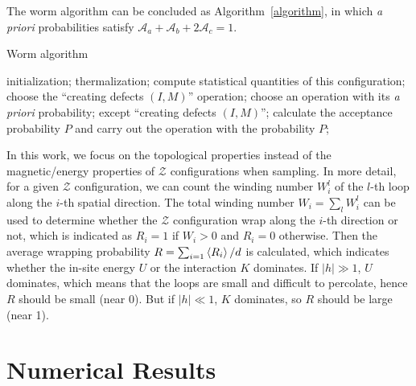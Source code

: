\documentclass{article}
\theoremstyle{plain} \newtheorem{thm}{Theorem}[section]
\theoremstyle{definition} \newtheorem{df}{Definition}[section]
\theoremstyle{definition} \newtheorem{eg}{Example}
\theoremstyle{remark} \newtheorem*{rmk}{Remark}
\begin{document}
The worm algorithm can be concluded as Algorithm~\ref{algorithm}, in which \textit{a priori} probabilities satisfy $\mathcal{A}_a+\mathcal{A}_b+2\mathcal{A}_c = 1$.\\
\begin{minipage}{\linewidth}
  \begin{algorithm}[H]
  \caption{Worm algorithm}
  \label{algorithm}
  \begin{algorithmic}
    \STATE initialization;
    \STATE thermalization;
    \LOOP
        \STATE compute statistical quantities of this configuration;
        \STATE choose the ``creating defects $(I, M)$'' operation;
      \ELSE
        \STATE  choose an operation with its \textit{a priori}  probability;
        except ``creating defects $(I, M)$'';
      \ENDIF
      \STATE calculate the acceptance probability $P$ and carry out the operation with the probability $P$;
    \ENDLOOP
  \end{algorithmic}
\end{algorithm}
\end{minipage}
\vspace{3mm}

In this work, we focus on the topological properties instead of the magnetic/energy properties of $\mathcal{Z}$ configurations when sampling. In more detail, for a given $\mathcal{Z}$ configuration, we can count the winding number $W_i^l$ of the $l$-th loop along the $i$-th spatial direction. The total winding number $W_i = \sum_{l}W_i^l$ can be used to determine whether the $\mathcal{Z}$ configuration wrap along the $i$-th direction or not, which is indicated as $R_i = 1$ if $W_i > 0$ and $R_i = 0$ otherwise. Then the average wrapping probability $R = \sum_{i=1}\braket{R_i}/d$ is calculated, which indicates whether the in-site energy $U$ or the interaction $K$ dominates. If $|h| \gg 1$, $U$ dominates, which means that the loops are small and difficult to percolate, hence $R$ should be small (near 0). But if $|h| \ll 1$, $K$ dominates, so $R$ should be large (near 1).
\section{Numerical Results}
\end{document}
